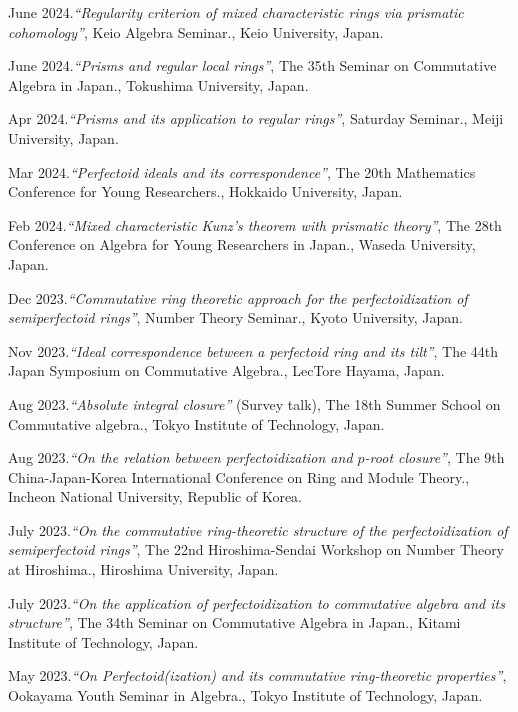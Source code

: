 \documentclass[10pt,a4paper,sans]{moderncv}
\begin{document}
\begin{etaremune}
  \item June 2024.\emph{``Regularity criterion of mixed characteristic rings via prismatic cohomology''}, \textsf{Keio Algebra Seminar.}, Keio University, Japan.
  \item June 2024.\emph{``Prisms and regular local rings''}, \textsf{The 35th Seminar on Commutative Algebra in Japan.}, Tokushima University, Japan.
  \item Apr 2024.\emph{``Prisms and its application to regular rings''}, \textsf{Saturday Seminar.}, Meiji University, Japan.
  \item Mar 2024.\emph{``Perfectoid ideals and its correspondence''}, \textsf{The 20th Mathematics Conference for Young Researchers.}, Hokkaido University, Japan.
  \item Feb 2024.\emph{``Mixed characteristic Kunz's theorem with prismatic theory''}, \textsf{The 28th Conference on Algebra for Young Researchers in Japan.}, Waseda University, Japan.
  \item Dec 2023.\emph{``Commutative ring theoretic approach for the perfectoidization of semiperfectoid rings''}, \textsf{Number Theory Seminar.}, Kyoto University, Japan.
  \item Nov 2023.\emph{``Ideal correspondence between a perfectoid ring and its tilt''}, \textsf{The 44th Japan Symposium on Commutative Algebra.}, LecTore Hayama, Japan.
  \item Aug 2023.\emph{``Absolute integral closure''} (Survey talk), \textsf{The 18th Summer School on Commutative algebra.}, Tokyo Institute of Technology, Japan.
  \item Aug 2023.\emph{``On the relation between perfectoidization and \(p\)-root closure''}, \textsf{The 9th China-Japan-Korea International Conference on Ring and Module Theory.}, Incheon National University, Republic of Korea.
  \item July 2023.\emph{``On the commutative ring-theoretic structure of the perfectoidization of semiperfectoid rings''}, \textsf{The 22nd Hiroshima-Sendai Workshop on Number Theory at Hiroshima.}, Hiroshima University, Japan.
  \item July 2023.\emph{``On the application of perfectoidization to commutative algebra and its structure''}, \textsf{The 34th Seminar on Commutative Algebra in Japan.}, Kitami Institute of Technology, Japan.
  \item May 2023.\emph{``On Perfectoid(ization) and its commutative ring-theoretic properties''}, \textsf{Ookayama Youth Seminar in Algebra.}, Tokyo Institute of Technology, Japan.

\end{etaremune}
\end{document}
